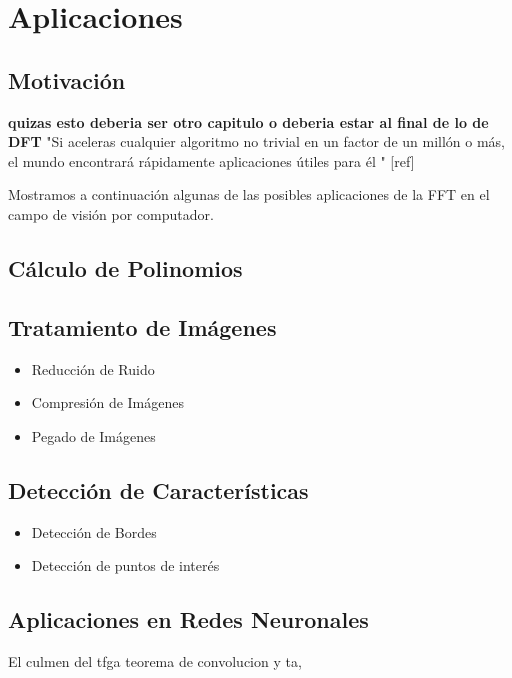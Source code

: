 \chapter{Aplicaciones}


\section{Motivación}
\textbf{quizas esto deberia ser otro capitulo o deberia estar al final de lo de DFT}
"Si aceleras cualquier algoritmo no trivial en un factor de un millón o más, el mundo encontrará rápidamente aplicaciones útiles para él " [ref]

\noindent Mostramos a continuación algunas de las posibles aplicaciones de la FFT en el campo de visión por computador.

\section{Cálculo de Polinomios}

\section{Tratamiento de Imágenes}

\begin{itemize}
    \item Reducción de Ruido
    \item Compresión de Imágenes
    \item Pegado de Imágenes

\end{itemize}

\section{Detección de Características}
\begin{itemize}
    \item Detección de Bordes
    \item Detección de puntos de interés
\end{itemize}

\section{Aplicaciones en Redes Neuronales}
El culmen del tfga
teorema de convolucion y ta,